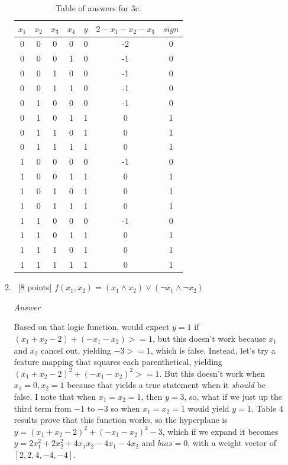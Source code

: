 \documentclass[12pt, fullpage,letterpaper]{article}
\begin{document}
\begin{enumerate}
\begin{enumerate}
		\begin{table}
        	\centering
        	\begin{tabular}{cccccc|c}
        		$x_1 $ & $x_2$ & $x_3$ & $x_4$ & $y$ & $2-x_1-x_2-x_3$ & $sign$\\ 
        		\hline\hline
        		0 & 0 & 0 & 0 & 0 & -2 & 0 \\ \hline
        		0 & 0 & 0 & 1 & 0 & -1 & 0 \\ \hline
        		0 & 0 & 1 & 0 & 0 & -1 & 0 \\ \hline
        		0 & 0 & 1 & 1 & 0 & -1 & 0 \\ \hline
        		0 & 1 & 0 & 0 & 0 & -1 & 0 \\ \hline
        		0 & 1 & 0 & 1 & 1 &  0 & 1 \\ \hline
        		0 & 1 & 1 & 0 & 1 &  0 & 1 \\ \hline
        		0 & 1 & 1 & 1 & 1 &  0 & 1 \\ \hline
        		1 & 0 & 0 & 0 & 0 & -1 & 0 \\ \hline
        		1 & 0 & 0 & 1 & 1 &  0 & 1 \\ \hline
        		1 & 0 & 1 & 0 & 1 &  0 & 1 \\ \hline
        		1 & 0 & 1 & 1 & 1 &  0 & 1 \\ \hline
        		1 & 1 & 0 & 0 & 0 & -1 & 0 \\ \hline
        		1 & 1 & 0 & 1 & 1 &  0 & 1 \\ \hline
        		1 & 1 & 1 & 0 & 1 &  0 & 1 \\ \hline
        		1 & 1 & 1 & 1 & 1 &  0 & 1 \\ \hline
        	\end{tabular}
        	\caption{Table of answers for 3c.}\label{tb:1}
        \end{table}
        
		\item ~[8 points] $f(x_1, x_2) = (x_1 \land x_2) \lor (\neg x_1 \land \neg x_2)$
		
		\emph{Answer}
		
		Based on that logic function, would expect $y=1$ if $(x_1+x_2-2)+(-x_1-x_2)>=1$, but this doesn't work because $x_1$ and $x_2$ cancel out, yielding $-3>=1$, which is false. Instead, let's try a feature mapping that squares each parenthetical, yielding $(x_1+x_2-2)^2+(-x_1-x_2)^2>=1$. But this doesn't work when $x_1=0, x_2=1$ because that yields a true statement when it \emph{should} be false. I note that when $x_1=x_2=1$, then $y=3$, so, what if we just up the third term from $-1$ to $-3$ so when $x_1=x_2=1$ would yield $y=1$. Table 4 results prove that this function works, so the hyperplane is $y=(x_1+x_2-2)^2+(-x_1-x_2)^2-3$, which if we expand it becomes $y=2x_1^2+2x_2^2+4x_1x_2-4x_1-4x_2$ and $bias=0$, with a weight vector of $[2, 2, 4, -4, -4]$.
		

\end{enumerate}
\end{enumerate}
\end{document}
